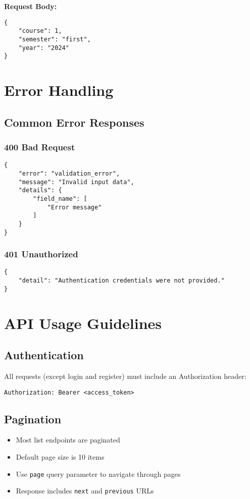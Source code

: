 \documentclass[11pt,a4paper]{article}
\begin{document}
\textbf{Request Body:}
\begin{lstlisting}[style=json]
{
    "course": 1,
    "semester": "first",
    "year": "2024"
}
\end{lstlisting}

\section{Error Handling}

\subsection{Common Error Responses}

\subsubsection{400 Bad Request}
\begin{lstlisting}[style=json]
{
    "error": "validation_error",
    "message": "Invalid input data",
    "details": {
        "field_name": [
            "Error message"
        ]
    }
}
\end{lstlisting}

\subsubsection{401 Unauthorized}
\begin{lstlisting}[style=json]
{
    "detail": "Authentication credentials were not provided."
}
\end{lstlisting}

\section{API Usage Guidelines}

\subsection{Authentication}
All requests (except login and register) must include an Authorization header:
\begin{lstlisting}[style=http]
Authorization: Bearer <access_token>
\end{lstlisting}

\subsection{Pagination}
\begin{itemize}
    \item Most list endpoints are paginated
    \item Default page size is 10 items
    \item Use \texttt{page} query parameter to navigate through pages
    \item Response includes \texttt{next} and \texttt{previous} URLs
\end{itemize}
\end{document}
